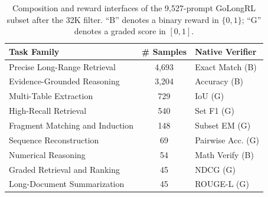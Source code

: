 \begin{table}[ht]
\captionsetup{justification=raggedright,singlelinecheck=false,skip=6pt}
\caption{Composition and reward interfaces of the 9{,}527-prompt GoLongRL subset after the 32K filter. ``B'' denotes a binary reward in $\{0,1\}$; ``G'' denotes a graded score in $[0,1]$.}
\label{tab:training-rewards}
\centering
\small
\setlength{\tabcolsep}{3.2pt}
\renewcommand{\arraystretch}{1.05}
\begin{tabular}{@{}l c l@{}}
\toprule
\textbf{Task Family} & \textbf{\# Samples} & \textbf{Native Verifier} \\
\midrule
Precise Long-Range Retrieval & 4,693 & Exact Match (B) \\
Evidence-Grounded Reasoning & 3,204 & Accuracy (B) \\
Multi-Table Extraction & 729 & IoU (G) \\
High-Recall Retrieval & 540 & Set F1 (G) \\
Fragment Matching and Induction & 148 & Subset EM (G) \\
Sequence Reconstruction & 69 & Pairwise Acc. (G) \\
Numerical Reasoning & 54 & Math Verify (B) \\
Graded Retrieval and Ranking & 45 & NDCG (G) \\
Long-Document Summarization & 45 & ROUGE-L (G) \\
\bottomrule
\end{tabular}
\end{table}

